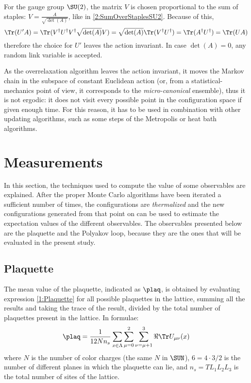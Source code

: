 For the gauge group $\SU(2)$, the matrix $V$ is chosen proportional to the sum of staples: $V=\frac{A}{\sqrt{\det(A)}}$, like in \eqref{2:SumOverStaplesSU2}.
Because of this,
\begin{equation}
    \Tr(U'A) = \Tr(V^\dagger U^\dagger V^\dagger \sqrt{\det(A)} V) = \sqrt{\det(A)} \Tr(V^\dagger U^\dagger) = \Tr(A^\dagger U^\dagger) = \Tr(UA) \label{2:ORTrace}
\end{equation}
therefore the choice for $U'$ leaves the action invariant.
In case $\det(A)=0$, any random link variable is accepted.

As the overrelaxation algorithm leaves the action invariant, it moves the Markov chain in the subspace of constant Euclidean action (or, from a statistical-mechanics point of view, it corresponds to the \emph{micro-canonical} ensemble), thus it is not ergodic: it does not visit every possible point in the configuration space if given enough time.
For this reason, it has to be used in combination with other updating algorithms, such as some steps of the Metropolis or heat bath algorithms.

\section{Measurements}
In this section, the techniques used to compute the value of some observables are explained.
After the proper Monte Carlo algorithms have been iterated a sufficient number of times, the configurations are \emph{thermalized} and the new configurations generated from that point on can be used to estimate the expectation values of the different observables.
The observables presented below are the plaquette and the Polyakov loop, because they are the ones that will be evaluated in the present study.

\subsection{Plaquette}
The mean value of the plaquette, indicated as $\plaq$, is obtained by evaluating expression \eqref{1:Plaquette} for all possible plaquettes in the lattice, summing all the results and taking the trace of the result, divided by the total number of plaquettes present in the lattice.
In formulae:
\begin{equation}
    \plaq = \frac{1}{12 N n_s} \sum_{x\in\Lambda} \sum_{\mu=0}^2 \sum_{\substack{\nu=\mu+1}}^3 \Re\Tr U_{\mu\nu}(x) \label{2:LatticePlaquette}
\end{equation}
where $N$ is the number of color charges (the same $N$ in $\SUN$), $6=4\cdot3/2$ is the number of different planes in which the plaquette can lie, and $n_s=TL_1L_2L_3$ is the total number of sites of the lattice.


